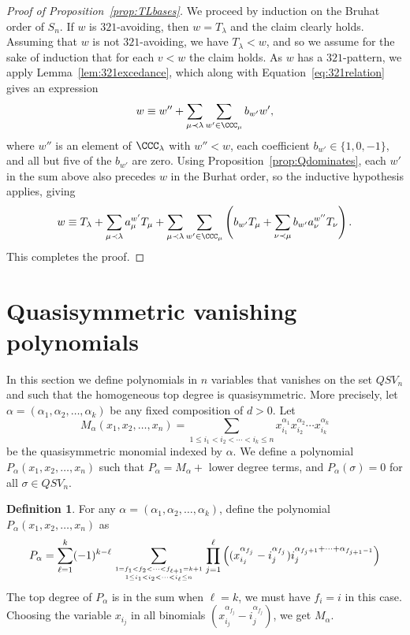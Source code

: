 \documentclass[12pt]{amsart}
\theoremstyle{definition}
\newtheorem{definition}[equation]{Definition}
\theoremstyle{remark}
\numberwithin{equation}{section}
\begin{document}
\begin{proof}[Proof of Proposition~\ref{prop:TLbases}]
We proceed by induction on the Bruhat order of $S_{n}$.  If $w$ is $321$-avoiding, then $w = T_{\lambda}$ and the claim clearly holds.  Assuming that $w$ is not $321$-avoiding, we have $T_{\lambda} < w$, and so we assume for the sake of induction that for each $v < w$ the claim holds.  As $w$ has a $321$-pattern, we apply Lemma~\ref{lem:321excedance}, which along with Equation~\eqref{eq:321relation} gives an expression
\[
w \equiv w'' + \sum_{\mu \prec \lambda} \sum_{w' \in \CCC_{\mu}} b_{w'} w',
\]
where $w''$ is an element of $\CCC_{\lambda}$ with $w'' < w$, each coefficient $b_{w'} \in \{1, 0, -1\}$, and all but five of the $b_{w'}$ are zero.  Using Proposition~\ref{prop:Qdominates}, each $w'$ in the sum above also precedes $w$ in the Burhat order, so the inductive hypothesis applies, giving
\[
w \equiv T_{\lambda} + \sum_{\mu \prec \lambda} a_{\mu}^{w'} T_{\mu} + \sum_{\mu \prec \lambda} \sum_{w' \in \CCC_{\mu}} \left( b_{w'} T_{\mu} + \sum_{\nu \prec \mu} b_{w'} a_{\nu}^{w''} T_{\nu}\right).
\]
This completes the proof.
\end{proof}


\section{Quasisymmetric vanishing polynomials}
In this section we define polynomials in $n$ variables that vanishes on the set $QSV_n$ and such that
the homogeneous top degree is quasisymmetric. More precisely, let $\alpha=(\alpha_1,\alpha_2,\ldots,\alpha_k)$
be any fixed composition of $d>0$. Let 
	$$M_\alpha(x_1,x_2,\ldots,x_n)=\sum_{1\le i_1<i_2<\cdots<i_k\le n} x_{i_1}^{\alpha_1} x_{i_2}^{\alpha_2}\cdots  x_{i_k}^{\alpha_k}$$
be the quasisymmetric monomial indexed by $\alpha$. We  define a polynomial $P_\alpha(x_1,x_2,\ldots,x_n)$ such that
  $P_\alpha = M_\alpha +$  lower degree terms, and  $P_\alpha(\sigma)=0$  for all $\sigma\in QSV_n$.


\begin{definition}\label{def:vanishP}
 For any $\alpha=(\alpha_1,\alpha_2,\ldots,\alpha_k)$, define the polynomial $P_\alpha(x_1,x_2,\ldots,x_n)$ as
	$$P_\alpha=\sum_{\ell=1}^k (-1)^{k-\ell} \sum_{1=f_1<f_2<\cdots <f_{\ell+1}=k+1  \atop 1\le i_1<i_2<\cdots < i_\ell\le n} \prod_{j=1}^\ell 
	      \Big( (x_{i_j}^{\alpha_{f_j}}- i_j^{\alpha_{f_j }})  i_j^{\alpha_{f_j +1}+\cdots+\alpha_{f_{j +1}-1}} \Big)
	      $$
	      The top degree of $P_\alpha$ is in the sum when $\ell=k$, we must have $f_i=i$ in this case. Choosing the variable $x_{i_j}$ in all binomials $(x_{i_j}^{\alpha_{f_j}}- i_j^{\alpha_{f_j }})$, we get $M_\alpha$.
\end{definition}
	      
\end{document}
